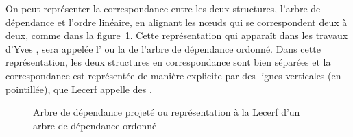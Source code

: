 On peut représenter la correspondance entre les deux structures, l’arbre de dépendance et l’ordre linéaire, en alignant les nœuds qui se correspondent deux à deux, comme dans la figure~\ref{fig:noel-Lecerf}. Cette représentation qui apparaît dans les travaux d'Yves \citet{lecerf1960programme}, sera appelée l' ou la   de l'arbre de dépendance ordonné. Dans cette représentation, les deux structures en correspondance sont bien séparées et la correspondance est représentée de manière explicite par des lignes verticales (en pointillée), que Lecerf appelle des .

\begin{figure}
\caption{Arbre de dépendance projeté ou représentation à la Lecerf d'un arbre de dépendance ordonné\label{fig:noel-Lecerf}}

\end{figure}

